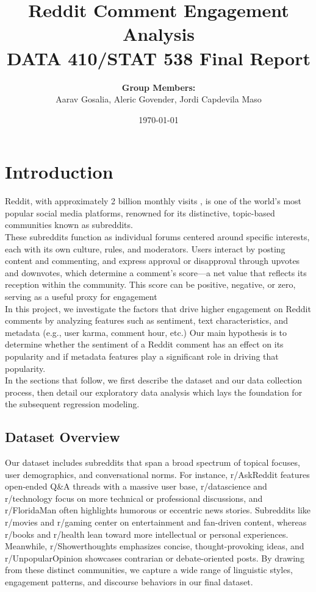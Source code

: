 \documentclass[10pt]{article}
\title{%
  \textbf{Reddit Comment Engagement Analysis}\\
  \large DATA 410/STAT 538 Final Report
}
\author{%
  \textbf{Group Members:} \\ 
  Aarav Gosalia, Aleric Govender, Jordi Capdevila Maso
}
\date{\today}
\begin{document}
\maketitle

\tableofcontents
\clearpage

\section{Introduction}

Reddit, with approximately 2 billion monthly visits \cite{statista2023}, is one of the world's most popular social media platforms, renowned for its distinctive, topic-based communities known as subreddits. \\

\noindent These subreddits function as individual forums centered around specific interests, each with its own culture, rules, and moderators. Users interact by posting content and commenting, and express approval or disapproval through upvotes and downvotes, which determine a comment’s score—a net value that reflects its reception within the community. This score can be positive, negative, or zero, serving as a useful proxy for engagement \\

\noindent In this project, we investigate the factors that drive higher engagement on Reddit comments by analyzing features such as sentiment, text characteristics, and metadata (e.g., user karma, comment hour, etc.) Our main hypothesis is to determine whether the sentiment of a Reddit comment has an effect on its popularity and if metadata features play a significant role in driving that popularity.\\

\noindent In the sections that follow, we first describe the dataset and our data collection process, then detail our exploratory data analysis which lays the foundation for the subsequent regression modeling.


\subsection{Dataset Overview}
Our dataset includes subreddits that span a broad spectrum of topical focuses, user demographics, and conversational norms. For instance, r/AskReddit features open-ended Q\&A threads with a massive user base, r/datascience and r/technology focus on more technical or professional discussions, and r/FloridaMan often highlights humorous or eccentric news stories. Subreddits like r/movies and r/gaming center on entertainment and fan-driven content, whereas r/books and r/health lean toward more intellectual or personal experiences. Meanwhile, r/Showerthoughts emphasizes concise, thought-provoking ideas, and r/UnpopularOpinion showcases contrarian or debate-oriented posts. By drawing from these distinct communities, we capture a wide range of linguistic styles, engagement patterns, and discourse behaviors in our final dataset.\\
\end{document}
